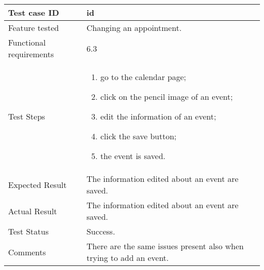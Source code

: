 \begin{table}[H]
	\begin{center}
		\begin{tabular}{ | p{} | p{} | }
		\hline
		Test case ID & id\\
		\hline
		Feature tested & Changing an appointment.\\
    	\hline
		Functional requirements & 6.3  \\
		\hline
		Test Steps & 
			\begin{enumerate}
				\item go to the calendar page;
				\item click on the pencil image of an event;
				\item edit the information of an event;
				\item click the save button;
				\item the event is saved.
			\end{enumerate} \\
		\hline
		Expected Result & The information edited about an event are saved.\\
		\hline
		Actual Result & The information edited about an event are saved.\\ 
		\hline
		Test Status & \color{ForestGreen}Success.\\ 
		\hline
		Comments & There are the same issues present also when trying to add an event.\\
		\hline
		\end{tabular}
	\end{center}
\end{table}

